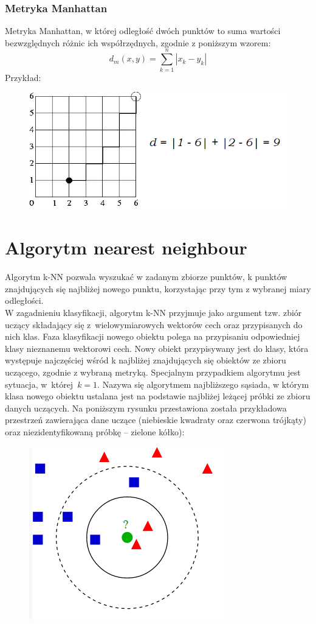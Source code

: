 \documentclass[11pt, a4paper, titlepage]{report}
\begin{document}
\subsubsection{Metryka Manhattan}
\label{subs:Metryka Manhattan}
Metryka Manhattan, w której odległość dwóch punktów to suma wartości bezwzględnych różnic ich współrzędnych, zgodnie z poniższym wzorem:
$$d_m(x,y) = \sum\limits_{k=1}^n |x_k - y_k|$$
Przykład:
\begin{figure}[h]
  \includegraphics[scale=0.5]{obrazki/manhattan}
\end{figure}

\section{Algorytm nearest neighbour}
\label{sec:Algorytm nearest neighbour}
Algorytm k-NN pozwala wyszukać w zadanym zbiorze punktów, k punktów znajdujących się najbliżej nowego punktu, korzystając przy tym z wybranej miary odległości.\\
W zagadnieniu klasyfikacji, algorytm k-NN przyjmuje jako argument tzw. zbiór uczący składający się z wielowymiarowych wektorów cech oraz przypisanych do nich klas. Faza klasyfikacji nowego obiektu polega na przypisaniu odpowiedniej klasy nieznanemu wektorowi cech. Nowy obiekt przypisywany jest do klasy, która występuje najczęściej wśród k najbliżej znajdujących się obiektów ze zbioru uczącego, zgodnie z wybraną metryką. Specjalnym przypadkiem algorytmu jest sytuacja, w której $k = 1$. Nazywa się algorytmem najbliższego sąsiada, w którym klasa nowego obiektu ustalana jest na podstawie najbliżej leżącej próbki ze zbioru danych uczących. Na poniższym rysunku przestawiona została przykładowa przestrzeń zawierająca dane uczące (niebieskie kwadraty oraz czerwona trójkąty) oraz niezidentyfikowaną próbkę – zielone kółko):
\begin{figure}[h]
  \includegraphics[scale=0.5]{obrazki/knn}
\end{figure}
\end{document}
